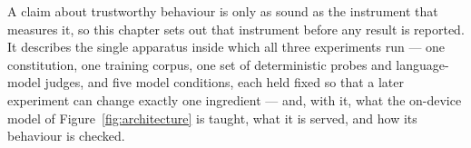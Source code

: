 %
%
%

A claim about trustworthy behaviour is only as sound as the instrument that measures it, so this chapter sets out that instrument before any result is reported. It describes the single apparatus inside which all three experiments run --- one constitution, one training corpus, one set of deterministic probes and language-model judges, and five model conditions, each held fixed so that a later experiment can change exactly one ingredient --- and, with it, what the on-device model of Figure~\ref{fig:architecture} is taught, what it is served, and how its behaviour is checked.

